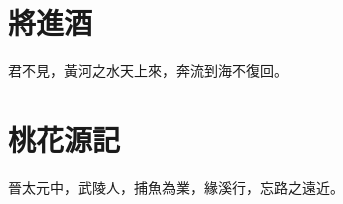 \documentclass[12pt,a4paper]{article}
\begin{document}
\begin{CJK*}{UTF8}{song}
  \tableofcontents

  \section{將進酒}
  君不見，黃河之水天上來，奔流到海不復回。

  \section{桃花源記}
  晉太元中，武陵人，捕魚為業，緣溪行，忘路之遠近。

\newpage

\end{CJK*}
\end{document}
